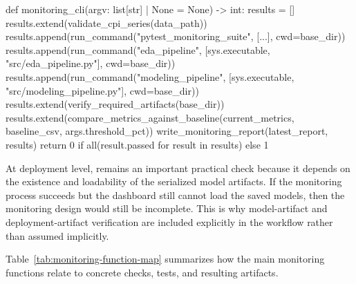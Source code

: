 \begin{Python}[caption={Monitoring workflow orchestration in the utility layer}, label={lst:monitoring-cli-flow}]
def monitoring_cli(argv: list[str] | None = None) -> int:
    results = []
    results.extend(validate_cpi_series(data_path))
    results.append(run_command("pytest_monitoring_suite", [...], cwd=base_dir))
    results.append(run_command("eda_pipeline", [sys.executable, "src/eda_pipeline.py"], cwd=base_dir))
    results.append(run_command("modeling_pipeline", [sys.executable, "src/modeling_pipeline.py"], cwd=base_dir))
    results.extend(verify_required_artifacts(base_dir))
    results.extend(compare_metrics_against_baseline(current_metrics, baseline_csv, args.threshold_pct))
    write_monitoring_report(latest_report, results)
    return 0 if all(result.passed for result in results) else 1
\end{Python}

At deployment level,  remains an important practical check because it depends on the existence and loadability of the serialized model artifacts. If the monitoring process succeeds but the dashboard still cannot load the saved models, then the monitoring design would still be incomplete. This is why model-artifact and deployment-artifact verification are included explicitly in the workflow rather than assumed implicitly.

Table~\ref{tab:monitoring-function-map} summarizes how the main monitoring functions relate to concrete checks, tests, and resulting artifacts.

